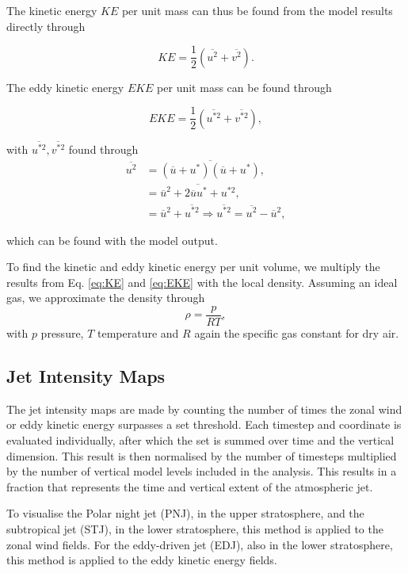The kinetic energy $KE$ per unit mass can thus be found from the model results directly through

\begin{equation}\label{eq:KE}
    KE = \frac{1}{2} \left( \overline{u^2} + \overline{v^2} \right).
\end{equation}

The eddy kinetic energy $EKE$ per unit mass can be found through 

\begin{equation}\label{eq:EKE}
    EKE = \frac{1}{2} \left( \overline{u^{\ast 2}} + \overline{v^{\ast 2}} \right),
\end{equation}

\noindent with $\overline{u^{\ast 2}}, \overline{v^{\ast 2}}$ found through
\begin{equation}
    \begin{split}
        \overline{u^2} &= \overline{\left( \overline{u} + u^\ast \right) \left( \overline{u} + u^\ast \right)},\\
        &= \overline{\overline{u}^2 + 2 \overline{u}u^\ast + u^{\ast 2}},\\
        &= \overline{u}^2 + \overline{u^{\ast 2}} \Rightarrow \overline{u^{\ast 2}} = \overline{u^2} - \overline{u}^2, 
    \end{split}
\end{equation}

which can be found with the model output. 

To find the kinetic and eddy kinetic energy per unit volume, we multiply the results from Eq. \ref{eq:KE} and \ref{eq:EKE} with the local density. Assuming an ideal gas, we approximate the density through
\begin{equation}
    \rho = \frac{p}{RT},
\end{equation}
\noindent with $p$ pressure, $T$ temperature and $R$ again the specific gas constant for dry air. 


\subsection{Jet Intensity Maps}
The jet intensity maps are made by counting the number of times the zonal wind or eddy kinetic energy surpasses a set threshold. Each timestep and coordinate is evaluated individually, after which the set is summed over time and the vertical dimension. This result is then normalised by the number of timesteps multiplied by the number of vertical model levels included in the analysis. This results in a fraction that represents the time and vertical extent of the atmospheric jet. 

To visualise the Polar night jet (PNJ), in the upper stratosphere, and the subtropical jet (STJ), in the lower stratosphere, this method is applied to the zonal wind fields. For the eddy-driven jet (EDJ), also in the lower stratosphere, this method is applied to the eddy kinetic energy fields. 
